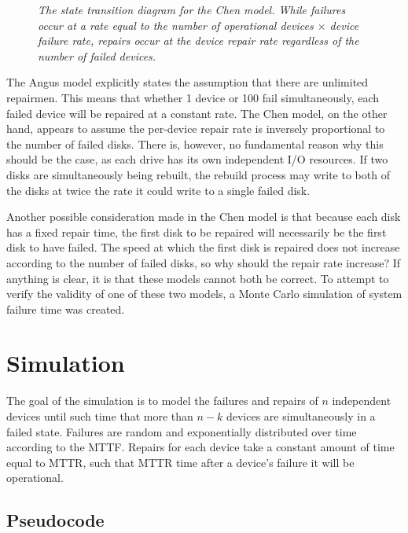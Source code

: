 \documentclass[XXX,endnotes]{usetex-v1}
\begin{document}
\begin{figure}[htbp]
\begin{centering}
\small\itshape
\caption{\small\itshape The state transition diagram for the Chen model.  While failures occur at a rate equal to the number of operational devices $\times$ device failure rate, repairs occur at the device repair rate regardless of the number of failed devices.}
\label{fig-sample}
\end{centering}
\end{figure}

The Angus model explicitly states the assumption that there are unlimited repairmen.  This means that whether 1 device or 100 fail simultaneously, each failed device will be repaired at a constant rate.  The Chen model, on the other hand, appears to assume the per-device repair rate is inversely proportional to the number of failed disks.  There is, however, no fundamental reason why this should be the case, as each drive has its own independent I/O resources.  If two disks are simultaneously being rebuilt, the rebuild process may write to both of the disks at twice the rate it could write to a single failed disk.

Another possible consideration made in the Chen model is that because each disk has a fixed repair time, the first disk to be repaired will necessarily be the first disk to have failed.  The speed at which the first disk is repaired does not increase according to the number of failed disks, so why should the repair rate increase?  If anything is clear, it is that these models cannot both be correct.  To attempt to verify the validity of one of these two models, a Monte Carlo simulation of system failure time was created. 

\section{Simulation}

The goal of the simulation is to model the failures and repairs of $n$ independent devices until such time that more than $n-k$ devices are simultaneously in a failed state.  Failures are random and exponentially distributed over time according to the MTTF.  Repairs for each device take a constant amount of time equal to MTTR, such that MTTR time after a device's failure it will be operational.

\subsection{Pseudocode}
\end{document}
